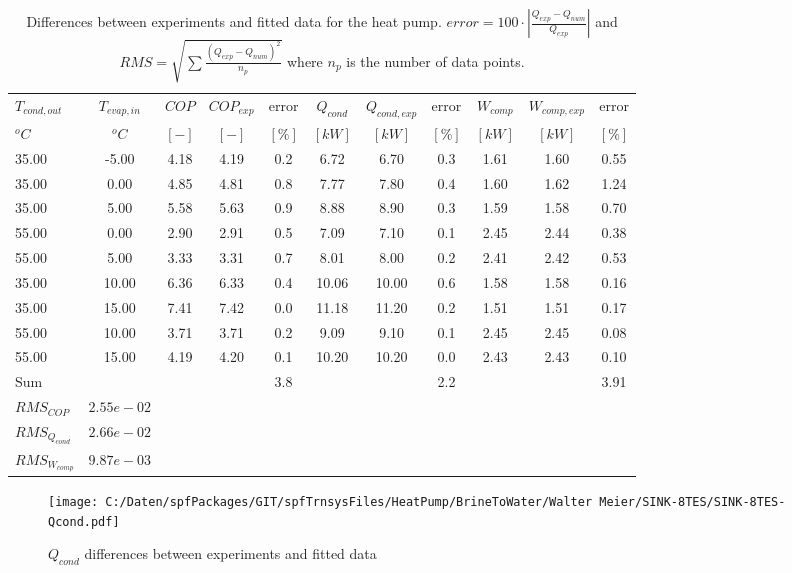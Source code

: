 \documentclass[english]{SPFShortReport}
\begin{document}
\begin{table}[!ht]
\begin{small}
\caption{Differences between experiments and fitted data for the heat pump.          $error=100 \cdot |\frac{Q_{exp}-Q_{num}}{Q_{exp}}|$ and $RMS = \sqrt { \sum{\frac{(Q_{exp}-Q_{num})^2}{n_p}} }$ where $n_p$ is the number of data points.}
\begin{center}
\resizebox{12cm}{!} 
{
\begin{tabular}{l | c c c c c c c c c c } 
\hline
\hline
$T_{cond,out}$ &$T_{evap,in}$ &$COP$ &$COP_{exp}$ &error &$Q_{cond}$ &$Q_{cond,exp}$ &error &$W_{comp}$ &$W_{comp,exp}$ &error \\ 
$^oC$ &$^oC$ &$[-]$ &$[-]$ &$[\%]$ &$[kW]$ &$[kW]$ &$[\%]$ &$[kW]$ &$[kW]$ &$[\%]$\\ 
\hline
35.00  & -5.00 & 4.18 & 4.19 & 0.2 & 6.72 & 6.70 & 0.3 & 1.61 & 1.60 & 0.55\\ 
35.00  & 0.00 & 4.85 & 4.81 & 0.8 & 7.77 & 7.80 & 0.4 & 1.60 & 1.62 & 1.24\\ 
35.00  & 5.00 & 5.58 & 5.63 & 0.9 & 8.88 & 8.90 & 0.3 & 1.59 & 1.58 & 0.70\\ 
55.00  & 0.00 & 2.90 & 2.91 & 0.5 & 7.09 & 7.10 & 0.1 & 2.45 & 2.44 & 0.38\\ 
55.00  & 5.00 & 3.33 & 3.31 & 0.7 & 8.01 & 8.00 & 0.2 & 2.41 & 2.42 & 0.53\\ 
35.00  & 10.00 & 6.36 & 6.33 & 0.4 & 10.06 & 10.00 & 0.6 & 1.58 & 1.58 & 0.16\\ 
35.00  & 15.00 & 7.41 & 7.42 & 0.0 & 11.18 & 11.20 & 0.2 & 1.51 & 1.51 & 0.17\\ 
55.00  & 10.00 & 3.71 & 3.71 & 0.2 & 9.09 & 9.10 & 0.1 & 2.45 & 2.45 & 0.08\\ 
55.00  & 15.00 & 4.19 & 4.20 & 0.1 & 10.20 & 10.20 & 0.0 & 2.43 & 2.43 & 0.10\\ 
\hline 
 Sum &  & &  & 3.8 &  &  & 2.2 & &  & 3.91\\ 
\hline 
 $RMS_{COP}$ & $2.55e-02$ \\ 
 $RMS_{Q_{cond}}$ & $2.66e-02$ \\ 
 $RMS_{W_{comp}}$ & $9.87e-03$ \\ 
\hline
\hline
\end{tabular}
}
\label{ErrorsTable}
\end{center}
\end{small}
\end{table}
\begin{figure}[!ht]
\begin{center}
\texttt{[image: C:/Daten/spfPackages/GIT/spfTrnsysFiles/HeatPump/BrineToWater/Walter Meier/SINK-8TES/SINK-8TES-Qcond.pdf]}
\caption{$Q_{cond}$ differences between experiments and fitted data}
\label{QcongFig}
\end{center}
\end{figure}
\end{document}
